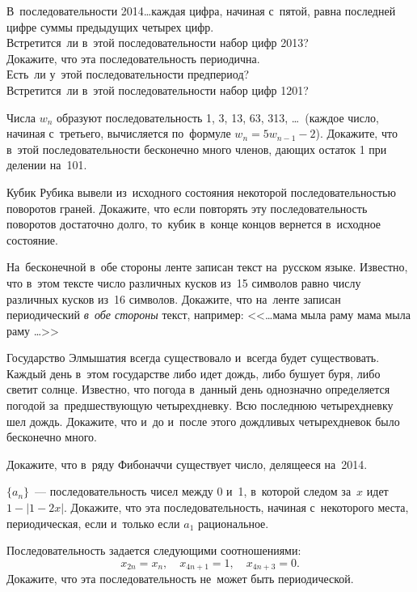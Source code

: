 \begin{problems}

\item
В~последовательности 2014\ldots каждая цифра, начиная с~пятой, равна последней
цифре суммы предыдущих четырех цифр.
\\
\sbp Встретится~ли в~этой последовательности набор цифр 2013?
\\
\sbp Докажите, что эта последовательность периодична.
\\
\sbp Есть~ли у~этой последовательности предпериод?
\\
\sbp Встретится~ли в~этой последовательности набор цифр 1201?

\item
Числа $w_n$ образуют последовательность
1, 3, 13, 63, 313, \ldots\ (каждое число, начиная с~третьего, вычисляется по~формуле
$w_n = 5 w_{n-1} - 2$).
Докажите, что в~этой последовательности бесконечно много членов, дающих остаток
1 при делении на~101.

\item
Кубик Рубика вывели из~исходного состояния некоторой последовательностью
поворотов граней.
Докажите, что если повторять эту последовательность поворотов достаточно долго,
то~кубик в~конце концов вернется в~исходное состояние.

\item
На~бесконечной в~обе стороны ленте записан текст на~русском языке.
Известно, что в~этом тексте число различных кусков из~15 символов равно числу
различных кусков из~16 символов.
Докажите, что на~ленте записан периодический \emph{в~обе стороны} текст,
например: <<\ldots мама мыла раму мама мыла раму \ldots>>


\item
Государство Элмышатия всегда существовало и~всегда будет существовать.
Каждый день в~этом государстве либо идет дождь, либо бушует буря, либо светит
солнце.
Известно, что погода в~данный день однозначно определяется погодой
за~предшествующую четырехдневку.
Всю последнюю четырехдневку шел дождь.
Докажите, что и~до и~после этого дождливых четырехдневок было бесконечно много.

\item
Докажите, что в~ряду Фибоначчи существует число, делящееся на~2014.

\item
$\{ a_n \}$~--- последовательность чисел между 0 и~1, в~которой следом за~$x$
идет $1 - |1 - 2 x|$.
Докажите, что эта последовательность, начиная с~некоторого места,
периодическая, если и~только если $a_1$ рациональное.

\item
Последовательность задается следующими соотношениями:
\[
    x_{2n} = x_n
,\quad
    x_{4n+1} = 1
,\quad
    x_{4n+3} = 0
.\]
Докажите, что эта последовательность не~может быть периодической.

\end{problems}

